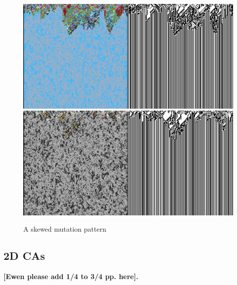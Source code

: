 \documentclass{AISB2008}
\begin{document}
\begin{figure}
\includegraphics[width=\columnwidth]{reef.png} \newline
\includegraphics[width=\columnwidth]{eoc.png} 
\caption{A skewed mutation pattern \label{reef}}
\end{figure}

\subsection{2D CAs} \label{2d-results}

\textbf{[Ewen please add 1/4 to 3/4 pp. here].}
\end{document}
